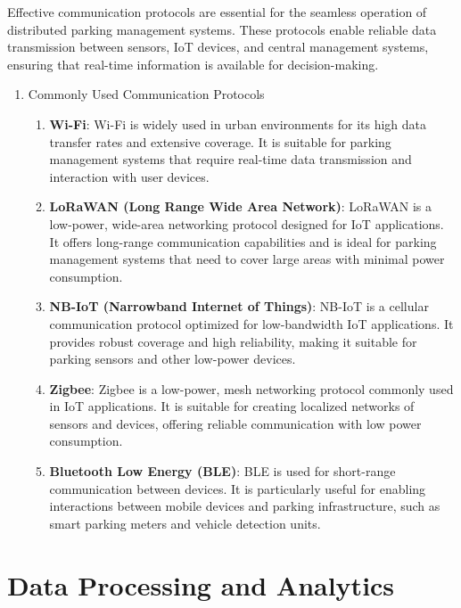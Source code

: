 \documentclass[oneside, 12pt, a4paper, draft]{book}
\begin{document}
Effective communication protocols are essential for the seamless operation of distributed parking management systems. These protocols enable reliable data transmission between sensors, IoT devices, and central management systems, ensuring that real-time information is available for decision-making.
\begin{enumerate}
\item Commonly Used Communication Protocols
\label{sec:orgd412678}

\begin{enumerate}
\item \textbf{Wi-Fi}: Wi-Fi is widely used in urban environments for its high data transfer rates and extensive coverage. It is suitable for parking management systems that require real-time data transmission and interaction with user devices.

\item \textbf{LoRaWAN (Long Range Wide Area Network)}: LoRaWAN is a low-power, wide-area networking protocol designed for IoT applications. It offers long-range communication capabilities and is ideal for parking management systems that need to cover large areas with minimal power consumption.

\item \textbf{NB-IoT (Narrowband Internet of Things)}: NB-IoT is a cellular communication protocol optimized for low-bandwidth IoT applications. It provides robust coverage and high reliability, making it suitable for parking sensors and other low-power devices.

\item \textbf{Zigbee}: Zigbee is a low-power, mesh networking protocol commonly used in IoT applications. It is suitable for creating localized networks of sensors and devices, offering reliable communication with low power consumption.

\item \textbf{Bluetooth Low Energy (BLE)}: BLE is used for short-range communication between devices. It is particularly useful for enabling interactions between mobile devices and parking infrastructure, such as smart parking meters and vehicle detection units.
\end{enumerate}
\end{enumerate}
\section{Data Processing and Analytics}
\label{sec:orgbb31df7}
\end{document}
